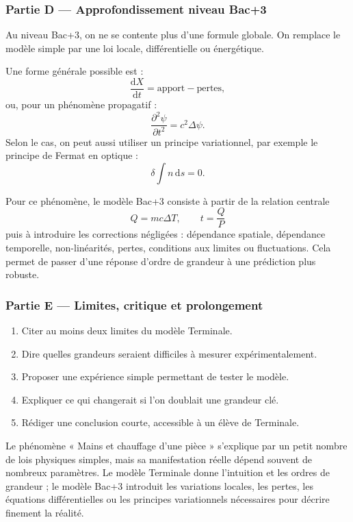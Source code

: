 \documentclass[11pt,a4paper]{article}
\begin{document}
\subsubsection*{Partie D — Approfondissement niveau Bac+3}

\begin{approfondissementbox}
Au niveau Bac+3, on ne se contente plus d'une formule globale. On remplace le modèle simple par une loi locale, différentielle ou énergétique.

Une forme générale possible est :
\[
\frac{\mathrm d X}{\mathrm dt}=\text{apport}-\text{pertes},
\]
ou, pour un phénomène propagatif :
\[
\frac{\partial^2 \psi}{\partial t^2}=c^2\Delta\psi.
\]
Selon le cas, on peut aussi utiliser un principe variationnel, par exemple le principe de Fermat en optique :
\[
\delta \int n\,\mathrm ds=0.
\]

Pour ce phénomène, le modèle Bac+3 consiste à partir de la relation centrale
\[
Q=mc\Delta T,\qquad t=\frac{Q}{P}
\]
puis à introduire les corrections négligées : dépendance spatiale, dépendance temporelle, non-linéarités, pertes, conditions aux limites ou fluctuations. Cela permet de passer d'une réponse d'ordre de grandeur à une prédiction plus robuste.
\end{approfondissementbox}

\subsubsection*{Partie E — Limites, critique et prolongement}

\begin{enumerate}
  \item Citer au moins deux limites du modèle Terminale.
  \item Dire quelles grandeurs seraient difficiles à mesurer expérimentalement.
  \item Proposer une expérience simple permettant de tester le modèle.
  \item Expliquer ce qui changerait si l'on doublait une grandeur clé.
  \item Rédiger une conclusion courte, accessible à un élève de Terminale.
\end{enumerate}

\begin{corrigebox}
Le phénomène « Mains et chauffage d'une pièce » s'explique par un petit nombre de lois physiques simples, mais sa manifestation réelle dépend souvent de nombreux paramètres. Le modèle Terminale donne l'intuition et les ordres de grandeur ; le modèle Bac+3 introduit les variations locales, les pertes, les équations différentielles ou les principes variationnels nécessaires pour décrire finement la réalité.
\end{corrigebox}
\end{document}
